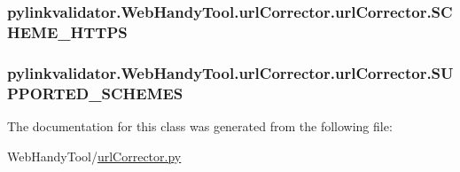 \subsubsection[{S\+C\+H\+E\+M\+E\+\_\+\+H\+T\+T\+PS}]{\setlength{\rightskip}{0pt plus 5cm}pylinkvalidator.\+Web\+Handy\+Tool.\+url\+Corrector.\+url\+Corrector.\+S\+C\+H\+E\+M\+E\+\_\+\+H\+T\+T\+PS}\hypertarget{classpylinkvalidator_1_1_web_handy_tool_1_1url_corrector_1_1url_corrector_af2a52a31f8cb0410112f845ddf8f75d5}{}\label{classpylinkvalidator_1_1_web_handy_tool_1_1url_corrector_1_1url_corrector_af2a52a31f8cb0410112f845ddf8f75d5}
\subsubsection[{S\+U\+P\+P\+O\+R\+T\+E\+D\+\_\+\+S\+C\+H\+E\+M\+ES}]{\setlength{\rightskip}{0pt plus 5cm}pylinkvalidator.\+Web\+Handy\+Tool.\+url\+Corrector.\+url\+Corrector.\+S\+U\+P\+P\+O\+R\+T\+E\+D\+\_\+\+S\+C\+H\+E\+M\+ES}\hypertarget{classpylinkvalidator_1_1_web_handy_tool_1_1url_corrector_1_1url_corrector_ab43ea2d3a9244b23ce58ea5e63934d1b}{}\label{classpylinkvalidator_1_1_web_handy_tool_1_1url_corrector_1_1url_corrector_ab43ea2d3a9244b23ce58ea5e63934d1b}


The documentation for this class was generated from the following file\+:\begin{DoxyCompactItemize}
\item 
Web\+Handy\+Tool/\hyperlink{url_corrector_8py}{url\+Corrector.\+py}\end{DoxyCompactItemize}
